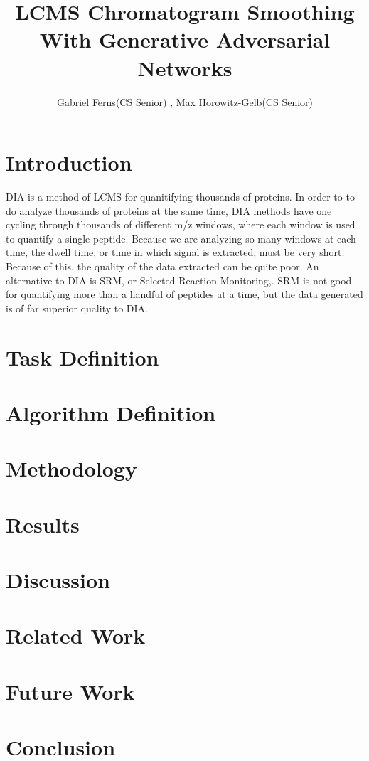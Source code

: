 \documentclass[12pt]{article}
\title{LCMS Chromatogram Smoothing With Generative Adversarial Networks}
\author{Gabriel Ferns(CS Senior) , Max Horowitz-Gelb(CS Senior)}
\begin{document}
\maketitle


\section{Introduction}
DIA \cite{DIA} is a method of LCMS for quanitifying thousands of proteins. In order to to do analyze thousands of proteins at the same time, DIA methods have one cycling through thousands of different m/z windows, where each window is used to quantify a single peptide. Because we are analyzing so many windows at each time, the dwell time, or time in which signal is extracted, must be very short. Because of this, the quality of the data extracted can be quite poor. An alternative to DIA is SRM, or Selected Reaction Monitoring,\cite{SRM}. SRM is not good for quantifying more than a handful of peptides at a time, but the data generated is of far superior quality to DIA.

\section{Task Definition}
\section{Algorithm Definition}
\section{Methodology}
\section{Results}
\section{Discussion}
\section{Related Work}
\section{Future Work}
\section{Conclusion}

{}

\end{document}
